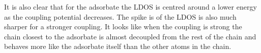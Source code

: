 It is also clear that for the adsorbate the LDOS is centred around a lower energy as the coupling potential decreases. The spike is of the LDOS is also much sharper for a stronger coupling. It looks like when the coupling is strong the chain closest to the adsorbate is almost decoupled from the rest of the chain and behaves more like the adsorbate itself than the other atoms in the chain.